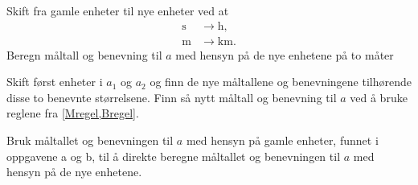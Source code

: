 \documentclass[a4paper,11pt]{article}
\begin{document}
\begin{subproblem}
    Skift fra gamle enheter til nye enheter ved at
    \begin{align*}
      \si{\s} &\rightarrow \si{\hour},\\
      \si{\m} &\rightarrow \si{\km}.
    \end{align*}
    Beregn måltall og benevning til $a$ med hensyn på de nye
    enhetene på to måter
    \begin{subsubproblem}
        \label{subsubproblem:MAT-0001-Exercise-03-Problem-N-2.6.6.1-c-i}
        Skift først enheter i $a_1$ og $a_2$ og finn de nye måltallene
        og benevningene tilhørende disse to benevnte størrelsene. Finn så
        nytt måltall og benevning til $a$ ved å bruke reglene fra \cref{Mregel,Bregel}.
    \end{subsubproblem}
    \begin{subsubproblem}
        \label{subsubproblem:MAT-0001-Exercise-03-Problem-N-2.6.6.1-c-ii}
        Bruk måltallet og benevningen til $a$ med hensyn på gamle
        enheter, funnet i oppgavene a og b, til å direkte beregne måltallet
        og benevningen til $a$ med hensyn på de nye enhetene.
    \end{subsubproblem}
\end{subproblem}
\end{document}
